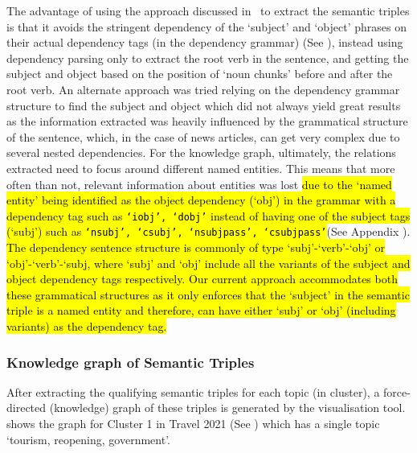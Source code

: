 The advantage of using the approach discussed in~ to extract the semantic triples is that it avoids the stringent dependency of the `subject' and `object' phrases on their actual dependency tags (in the dependency grammar) (See ), instead using dependency parsing only to extract the root verb in the sentence, and getting the subject and object based on the position of `noun chunks' before and after the root verb. An alternate approach was tried relying on the dependency grammar structure to find the subject and object which did not always yield great results as the information extracted was heavily influenced by the grammatical structure of the sentence, which, in the case of news articles, can get very complex due to several nested dependencies. For the knowledge graph, ultimately, the relations extracted need to focus around different named entities. This means that more often than not, relevant information about entities was lost \hl{due to the `named entity' being identified as the object dependency (`obj') in the grammar with a dependency tag such as \texttt{`iobj', `dobj'} instead of having one of the subject tags (`subj') such as \texttt{`nsubj', `csubj', `nsubjpass',	`csubjpass'}}(See Appendix ). \hl{The dependency sentence structure is commonly of type `subj'-`verb'-`obj' or `obj'-`verb'-`subj, where `subj' and `obj' include all the variants of the subject and object dependency tags respectively. Our current approach accommodates both these grammatical structures as it only enforces that the `subject' in the semantic triple is a named entity and therefore, can have either `subj'  or `obj' (including variants) as the dependency tag. }



\subsubsection*{Knowledge graph of Semantic Triples}

After extracting the qualifying semantic triples for each topic (in cluster), a force-directed (knowledge) graph of these triples is generated by the visualisation tool.  shows the graph for Cluster 1 in Travel 2021 (See ) which has a single topic `tourism, reopening, government'. 

\vspace{-1ex}


